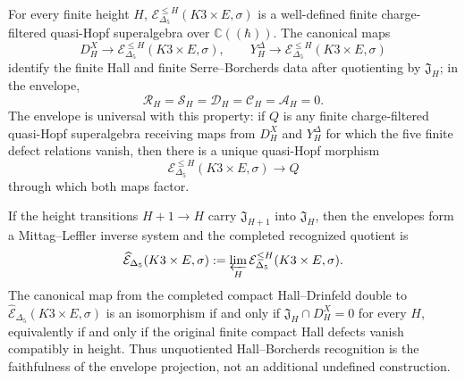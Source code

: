 \begin{theorem}
\label{thm:k3e-finite-recognition-envelope}
For every finite height \(H\),
\(\mathcal E^{\leq H}_{\Delta_5}(K3\times E,\sigma)\) is a
well-defined finite charge-filtered quasi-Hopf superalgebra over
\(\mathbb C((\hbar))\). The canonical maps
\[
 D_H^X\longrightarrow
 \mathcal E^{\leq H}_{\Delta_5}(K3\times E,\sigma),
 \qquad
 Y_H^\Delta\longrightarrow
 \mathcal E^{\leq H}_{\Delta_5}(K3\times E,\sigma)
\]
identify the finite Hall and finite Serre--Borcherds data after
quotienting by \(\mathfrak J_H\); in the envelope,
\[
 \mathcal R_H=\mathcal S_H=\mathcal D_H=\mathcal C_H=\mathcal A_H=0.
\]
The envelope is universal with this property: if \(Q\) is any finite
charge-filtered quasi-Hopf superalgebra receiving maps from \(D_H^X\)
and \(Y_H^\Delta\) for which the five finite defect relations vanish,
then there is a unique quasi-Hopf morphism
\[
 \mathcal E^{\leq H}_{\Delta_5}(K3\times E,\sigma)\longrightarrow Q
\]
through which both maps factor.

If the height transitions \(H+1\to H\) carry
\(\mathfrak J_{H+1}\) into \(\mathfrak J_H\), then the envelopes form a
Mittag--Leffler inverse system and the completed recognized quotient is
\[
 \widehat{\mathcal E}_{\Delta_5}(K3\times E,\sigma)
 :=
 \varprojlim_H
 \mathcal E^{\leq H}_{\Delta_5}(K3\times E,\sigma).
\]
The canonical map from the completed compact Hall--Drinfeld double to
\(\widehat{\mathcal E}_{\Delta_5}(K3\times E,\sigma)\) is an isomorphism
if and only if \(\mathfrak J_H\cap D_H^X=0\) for every \(H\), equivalently
if and only if the original finite compact Hall defects vanish
compatibly in height. Thus unquotiented Hall--Borcherds recognition is
the faithfulness of the envelope projection, not an additional
undefined construction.
\end{theorem}

